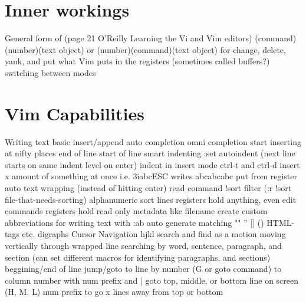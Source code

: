 \documentclass[12pt]{book}
\begin{document}
\section{Inner workings}
General form of (page 21 O'Reilly Learning the Vi and Vim editors) (command)(number)(text object) or (number)(command)(text object) for change, delete, yank, and put
what Vim puts in the registers (sometimes called buffers?)
switching between modes

\section{Vim Capabilities}
Writing text
  basic insert/append
  auto completion
  omni completion
  start inserting at nifty places 
    end of line
    start of line
    smart indenting
      :set autoindent (next line starts on same indent level on enter)
      indent in insert mode ctrl-t and ctrl-d
  insert x amount of something at once i.e. 3iabcESC writes abcabcabc
  put from register
  auto text wrapping (instead of hitting enter)
  read command
    !sort filter (:r !sort file-that-needs-sorting)
  alphanumeric sort lines
  registers hold anything, even edit commands 
  registers hold read only metadata like filename
  create custom abbreviations for writing text with :ab
  auto generate matching "" '' [] {} () HTML-tags etc.
  digraphs
Cursor Navigation 
  hjkl
  search and find as a motion
  moving vertically through wrapped line
  searching
  by word, sentence, paragraph, and section (can set different macros for identifying paragraphs, and sections)
  beggining/end of line
  jump/goto 
    to line by number (G or goto command)
    to column number with num prefix and |
    goto top, middle, or bottom line on screen (H, M, L) num prefix to go x lines away from top or bottom
\end{document}
